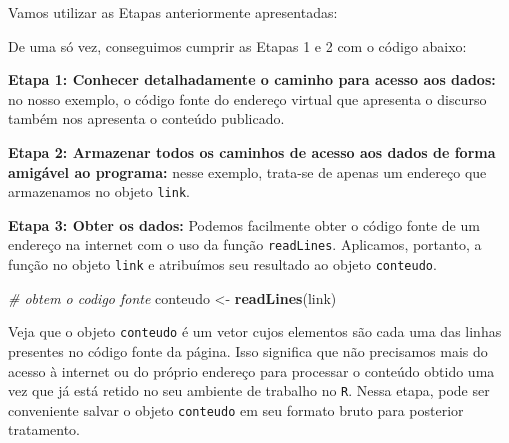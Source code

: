 \documentclass[]{book}
\newenvironment{Shaded}{\begin{snugshade}}{\end{snugshade}}
\newcommand{\CommentTok}[1]{\textcolor[rgb]{0.56,0.35,0.01}{\textit{#1}}}
\newcommand{\KeywordTok}[1]{\textcolor[rgb]{0.13,0.29,0.53}{\textbf{#1}}}
\newcommand{\NormalTok}[1]{#1}
\newcommand{\StringTok}[1]{\textcolor[rgb]{0.31,0.60,0.02}{#1}}
\begin{document}
Vamos utilizar as Etapas anteriormente apresentadas:

De uma só vez, conseguimos cumprir as Etapas 1 e 2 com o código abaixo:

\textbf{Etapa 1: Conhecer detalhadamente o caminho para acesso aos dados:} no nosso exemplo, o código
fonte do endereço virtual que apresenta o discurso também nos apresenta o conteúdo publicado.

\textbf{Etapa 2: Armazenar todos os caminhos de acesso aos dados de forma amigável ao programa:} nesse exemplo,
trata-se de apenas um endereço que armazenamos no objeto \texttt{link}.

\begin{Shaded}
\end{Shaded}

\textbf{Etapa 3: Obter os dados:} Podemos facilmente obter o código fonte de um endereço
na internet com o uso da função \texttt{readLines}. Aplicamos, portanto, a função no
objeto \texttt{link} e atribuímos seu resultado ao objeto \texttt{conteudo}.

\begin{Shaded}
\begin{Highlighting}[]
\CommentTok{# obtem o codigo fonte}
\NormalTok{conteudo <-}\StringTok{ }\KeywordTok{readLines}\NormalTok{(link)  }
\end{Highlighting}
\end{Shaded}

Veja que o objeto \texttt{conteudo} é um vetor cujos elementos são cada uma das linhas
presentes no código fonte da página. Isso significa que não precisamos mais do
acesso à internet ou do próprio endereço para processar o conteúdo obtido uma vez
que já está retido no seu ambiente de trabalho no \texttt{R}. Nessa etapa, pode ser
conveniente salvar o objeto \texttt{conteudo} em seu formato bruto para posterior
tratamento.
\end{document}

